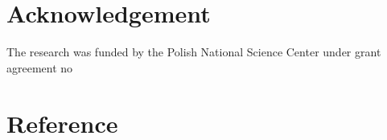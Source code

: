 \documentclass[preprint,12pt]{elsarticle}
\begin{document}
	\section*{Acknowledgement}
	The research was funded by the Polish National Science Center under grant agreement no 
	
	
	
	
	\section*{Reference}
	{}
	
\end{document}
